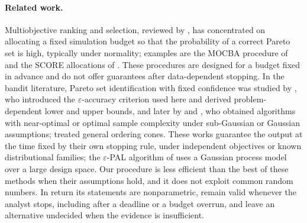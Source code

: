 \paragraph{Related work.} Multiobjective ranking and selection, reviewed by \citet{hunter2019}, has concentrated on allocating a fixed simulation budget so that the probability of a correct Pareto set is high, typically under normality; examples are the MOCBA procedure of \citet{lee2010} and the SCORE allocations of \citet{feldman2018}. These procedures are designed for a budget fixed in advance and do not offer guarantees after data-dependent stopping. In the bandit literature, Pareto set identification with fixed confidence was studied by \citet{auer2016}, who introduced the $\varepsilon$-accuracy criterion used here and derived problem-dependent lower and upper bounds, and later by \citet{kone2023} and \citet{crepon2024}, who obtained algorithms with near-optimal or optimal sample complexity under sub-Gaussian or Gaussian assumptions; \citet{ararat2023} treated general ordering cones. These works guarantee the output at the time fixed by their own stopping rule, under independent objectives or known distributional families; the $\varepsilon$-PAL algorithm of \citet{zuluaga2016} uses a Gaussian process model over a large design space. Our procedure is less efficient than the best of these methods when their assumptions hold, and it does not exploit common random numbers. In return its statements are nonparametric, remain valid whenever the analyst stops, including after a deadline or a budget overrun, and leave an alternative undecided when the evidence is insufficient.
